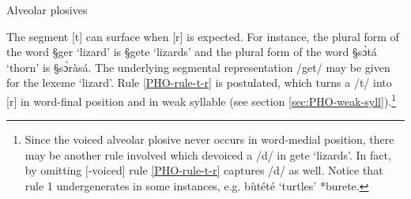  
\begin{table}[thb]
\centering
\caption{Alveolar plosives \label{tab:alveolar-plosives}}

\quad
{}


\end{table}


The segment [t] can surface when [r] is expected.  For instance, the plural form
of the
word 
{\S ger} `lizard' is {\S gete} `lizards' and the plural form
of the
word {\S sɔ̀tá} `thorn'  is {\S sɔ̀ràsá}. The underlying segmental
representation /get/ may be given for the lexeme `lizard'.    Rule
\ref{PHO-rule-t-r} is postulated, which turns a /t/ into  [r] in word-final
position and in weak syllable (see section
\ref{sec:PHO-weak-syll}).\footnote{Since
the voiced  alveolar plosive never occurs in word-medial position, there may be
another rule involved which devoiced  a /d/ in   {\F
gete} `lizards'. In fact, by omitting [{\sc -voiced}]  rule
\ref{PHO-rule-t-r} captures /d/  as well. Notice that  rule 1
undergenerates
in some instances, e.g. {\F bùtété} `turtles'  *{\F burete}.}


